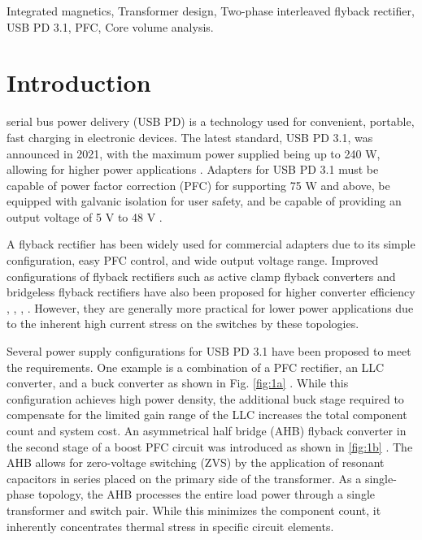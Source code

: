 \documentclass[lettersize,journal]{IEEEtran}
\begin{document}
\begin{IEEEkeywords}
Integrated magnetics, Transformer design, Two-phase interleaved flyback rectifier, USB PD 3.1, PFC, Core volume analysis.
\end{IEEEkeywords}

\section{Introduction}
 serial bus power delivery (USB PD) is a technology used for convenient, portable, fast charging in electronic devices. The latest standard, USB PD 3.1, was announced in 2021, with the maximum power supplied being up to 240 W, allowing for higher power applications \cite{ref1}. Adapters for USB PD 3.1 must be capable of power factor correction (PFC) for supporting 75 W and above, be equipped with galvanic isolation for user safety, and be capable of providing an output voltage of 5 V to 48 V \cite{ref2}.

A flyback rectifier has been widely used for commercial adapters due to its simple configuration, easy PFC control, and wide output voltage range. Improved configurations of flyback rectifiers such as active clamp flyback converters \cite{ref6, ref7} and bridgeless flyback rectifiers have also been proposed for higher converter efficiency \cite{ref8}, \cite{ref9}, \cite{ref10}, \cite{ref11}. However, they are generally more practical for lower power applications due to the inherent high current stress on the switches by these topologies. 

Several power supply configurations for USB PD 3.1 have been proposed to meet the requirements. One example is a combination of a PFC rectifier, an LLC converter, and a buck converter as shown in Fig. \ref{fig:1a} \cite{ref3, ref4}. While this configuration achieves high power density, the additional buck stage required to compensate for the limited gain range of the LLC increases the total component count and system cost. An asymmetrical half bridge (AHB) flyback converter in the second stage of a boost PFC circuit was introduced as shown in \ref{fig:1b} \cite{ref5}. The AHB allows for zero-voltage switching (ZVS) by the application of resonant capacitors in series placed on the primary side of the transformer. As a single-phase topology, the AHB processes the entire load power through a single transformer and switch pair. While this minimizes the component count, it inherently concentrates thermal stress in specific circuit elements.
\end{document}
